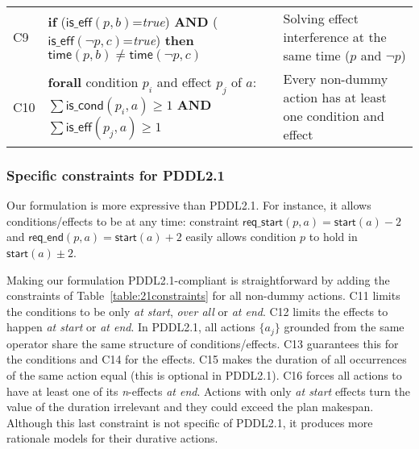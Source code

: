 \documentclass{ecai}
\newcommand{\iscond}{\mathsf{is\_cond}}    %
\newcommand{\iseff}{\mathsf{is\_eff}}    %
\newcommand{\start}{\mathsf{start}}%
\newcommand{\en}{\mathsf{end}}     %
\newcommand{\supp}{\mathsf{sup}}   %
\newcommand{\tim}{\mathsf{time}}   %
\newcommand{\reqs}{\mathsf{req\_{start}}} %
\newcommand{\reqe}{\mathsf{req\_{end}}}   %
\begin{document}
\begin{table*}
\begin{center}
\begin{scriptsize}
\begin{tabular}{p{0.1cm}p{10.2cm}p{6.4cm}}
				C9& \textbf{if} ($\iseff(p,b)$=\textit{true}) \textbf{AND} ($\iseff(\neg p,c)$=\textit{true}) \textbf{then} $\tim(p,b) \neq \tim(\neg p,c)$ & Solving effect interference at the same time ($p$ and $\neg p$) \\
				
				C10& \textbf{forall} condition $p_i$ and effect $p_j$ of $a$: $\sum \iscond(p_i,a) \geq 1$ \textbf{AND} $\sum \iseff(p_j,a) \geq 1$ & Every non-dummy action has at least one condition and effect \\
			\end{tabular}
		\end{scriptsize}	
		\label{table:constraints}
	\end{center}	
\end{table*}




\subsubsection*{Specific constraints for PDDL2.1}

Our formulation is more expressive than
PDDL2.1. For instance, it allows conditions/effects to be at any time:
constraint $\reqs(p,a)=\start(a)-2$ and $\reqe(p,a)=\start(a)+2$ easily allows condition $p$ to hold in $\start(a)\pm2$.

Making our formulation PDDL2.1-compliant is straightforward by adding the constraints of Table~\ref{table:21constraints} for all non-dummy actions. C11 limits the conditions to be only \emph{at start}, \emph{over all} or \emph{at end}. C12 limits the effects to happen \emph{at start} or \emph{at end}. In PDDL2.1, all actions $\{a_j\}$ grounded from the same operator share the same structure of conditions/effects. C13 guarantees this for the conditions and C14 for the effects.
C15 makes the duration of all occurrences of the same action equal (this is optional in PDDL2.1). 
C16 forces all actions to have at least one of its \textit{n}-effects \textit{at end}. Actions with only \textit{at start} effects turn the value of the duration irrelevant and they could exceed the plan makespan. Although this last constraint is not specific of PDDL2.1, it produces more rationale models for their durative actions.
\end{document}
